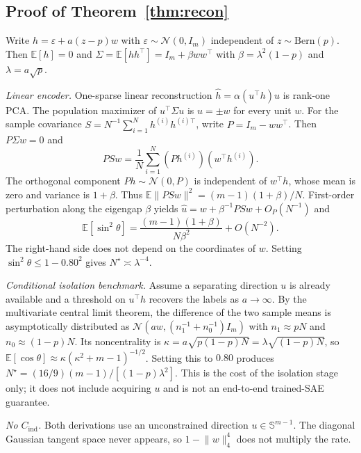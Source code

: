 \documentclass{article}
\theoremstyle{plain}
\begin{document}
{\subsection{Proof of Theorem~\ref{thm:recon}}
\label{app:recon}
Write $h=\varepsilon+a(z-p)w$ with $\varepsilon\sim\mathcal{N}(0,I_m)$ independent of $z\sim\mathrm{Bern}(p)$. Then $\mathbb{E}[h]=0$ and $\Sigma=\mathbb{E}[hh^{\top}]=I_m+\beta ww^{\top}$ with $\beta=\lambda^2(1-p)$ and $\lambda=a\sqrt{p}$.

\textit{Linear encoder.} One-sparse linear reconstruction $\hat h=\alpha(u^{\top}h)u$ is rank-one PCA. The population maximizer of $u^{\top}\Sigma u$ is $u=\pm w$ for every unit $w$. For the sample covariance $S=N^{-1}\sum_{i=1}^N h^{(i)}h^{(i)\top}$, write $P=I_m-ww^{\top}$. Then $P\Sigma w=0$ and
\[
PSw=\frac1N\sum_{i=1}^N (Ph^{(i)})(w^{\top}h^{(i)}).
\]
The orthogonal component $Ph\sim\mathcal{N}(0,P)$ is independent of $w^{\top}h$, whose mean is zero and variance is $1+\beta$. Thus $\mathbb{E}\lVert PSw\rVert^2=(m-1)(1+\beta)/N$. First-order perturbation along the eigengap $\beta$ yields $\hat u=w+\beta^{-1}PSw+O_P(N^{-1})$ and
\[
\mathbb{E}[\sin^2\theta]=\frac{(m-1)(1+\beta)}{N\beta^2}+O(N^{-2}).
\]
The right-hand side does not depend on the coordinates of $w$. Setting $\sin^2\theta\le 1-0.80^2$ gives $N^\star\asymp\lambda^{-4}$.

\textit{Conditional isolation benchmark.} Assume a separating direction $u$ is already available and a threshold on $u^{\top}h$ recovers the labels as $a\to\infty$. By the multivariate central limit theorem, the difference of the two sample means is asymptotically distributed as $\mathcal{N}(aw,(n_1^{-1}+n_0^{-1})I_m)$ with $n_1\approx pN$ and $n_0\approx(1-p)N$. Its noncentrality is $\kappa=a\sqrt{p(1-p)N}=\lambda\sqrt{(1-p)N}$, so $\mathbb{E}[\cos\theta]\approx\kappa(\kappa^2+m-1)^{-1/2}$. Setting this to $0.80$ produces $N^\star=(16/9)(m-1)/[(1-p)\lambda^2]$. This is the cost of the isolation stage only; it does not include acquiring $u$ and is not an end-to-end trained-SAE guarantee.

\textit{No $C_{\mathrm{ind}}$.} Both derivations use an unconstrained direction $u\in\mathbb{S}^{m-1}$. The diagonal Gaussian tangent space never appears, so $1-\lVert w\rVert_4^4$ does not multiply the rate.

}
\end{document}
